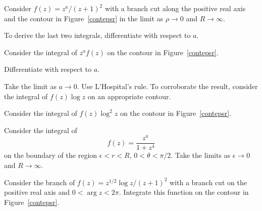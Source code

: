 {\begin{Hint}
  Consider $f(z) = z^a / (z+1)^2$ with a branch cut along the positive 
  real axis and the contour in Figure~\ref{contepsr} in the limit as
  $\rho \to 0$ and $R \to \infty$.  

  To derive the last two integrals, differentiate with respect to $a$.
\end{Hint}




\begin{Hint}
  \label{hint x^a/(1+x^2)}
\end{Hint}




\begin{Hint}
  \label{hint x^a f(x)}
  Consider the integral of $z^a f(z)$ on the contour in Figure~\ref{contepsr}.
\end{Hint}



\begin{Hint}
  \label{hint x^a f(x) log x}
  Differentiate with respect to $a$.
\end{Hint}



\begin{Hint}
  \label{hint intzi f(x)}
  Take the limit as $a \to 0$.  Use L'Hospital's rule.  To corroborate the 
  result, consider the integral of $f(z) \log z$ on an appropriate contour.
\end{Hint}



\begin{Hint}
  \label{hint f(x) log x}
  Consider the integral of $f(z) \log^2 z$ on the contour in 
  Figure~\ref{contepsr}.
\end{Hint}



\begin{Hint}
  \label{hint x^a/(1+x^4)}
  Consider the integral of 
  \[
  f(z) = \frac{ z^a }{ 1 + z^4 }
  \]
  on the boundary of the region $\epsilon < r < R$, $0 < \theta < \pi/2$.  
  Take the limits as $\epsilon \to 0$ and $R \to \infty$.
\end{Hint}



\begin{Hint}
  \label{hint x^(1/2) log x / (x+1)^2}
  Consider the branch of $f(z) = z^{1/2} \log z / (z+1)^2$ with a 
  branch cut on the positive real axis and $0 < \arg z < 2 \pi$.  Integrate
  this function on the contour in Figure~\ref{contepsr}.
\end{Hint}



}
